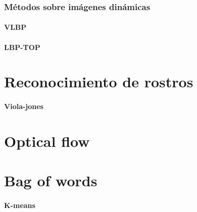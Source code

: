 	\subsubsection{Métodos sobre imágenes dinámicas}	
	\label{sec:met_videos}

		\paragraph{VLBP}
		\label{sec:vlbp}

		\paragraph{LBP-TOP}
		\label{sec:lbp-top}

\section{Reconocimiento de rostros}
\label{sec:rec_rostros}

	\paragraph{Viola-jones}
	\label{sec:viola-jones}

\section{Optical flow}
\label{sec:optical_flow}

\section{Bag of words}
\label{sec:bag_of_words}

	\paragraph{K-means}
	\label{sec:k-means}